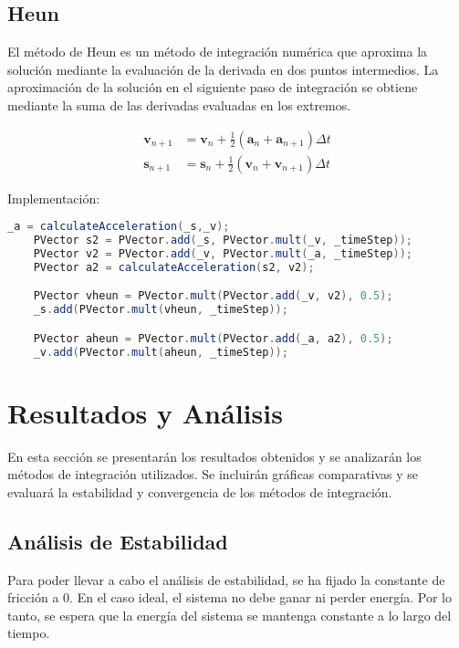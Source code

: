 \documentclass{article}
\begin{document}
\subsection{Heun}

El método de Heun es un método de integración numérica que aproxima la solución mediante la evaluación de la derivada en dos puntos intermedios. La aproximación de la solución en el siguiente paso de integración se obtiene mediante la suma de las derivadas evaluadas en los extremos.

\begin{align*}
    \mathbf{v}_{n+1} & = \mathbf{v}_n + \frac{1}{2} (\mathbf{a}_n + \mathbf{a}_{n+1}) \Delta t \\
    \mathbf{s}_{n+1} & = \mathbf{s}_n + \frac{1}{2} (\mathbf{v}_n + \mathbf{v}_{n+1}) \Delta t
\end{align*}

Implementación:

\begin{lstlisting}[language = Java, frame = single]
    _a = calculateAcceleration(_s,_v); 
    PVector s2 = PVector.add(_s, PVector.mult(_v, _timeStep)); 
    PVector v2 = PVector.add(_v, PVector.mult(_a, _timeStep)); 
    PVector a2 = calculateAcceleration(s2, v2); 

    PVector vheun = PVector.mult(PVector.add(_v, v2), 0.5); 
    _s.add(PVector.mult(vheun, _timeStep)); 

    PVector aheun = PVector.mult(PVector.add(_a, a2), 0.5); 
    _v.add(PVector.mult(aheun, _timeStep)); 

\end{lstlisting}

\section{Resultados y Análisis}

En esta sección se presentarán los resultados obtenidos y se analizarán los métodos de integración utilizados. Se incluirán gráficas comparativas y se evaluará la estabilidad y convergencia de los métodos de integración.

\subsection{Análisis de Estabilidad}

Para poder llevar a cabo el análisis de estabilidad, se ha fijado la constante de fricción a 0. En el caso ideal, el sistema no debe ganar ni perder energía. Por lo tanto, se espera que la energía del sistema se mantenga constante a lo largo del tiempo.
\end{document}
